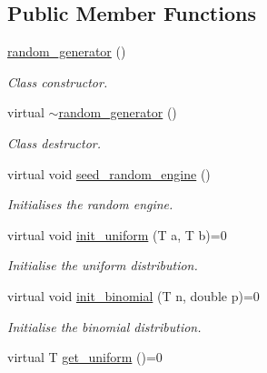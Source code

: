 \subsection*{Public Member Functions}
\begin{DoxyCompactItemize}
\item 
\hypertarget{classlgraph_1_1utils_1_1random__generator_af4f4ba363f6f72d3ded2dba9e97079bb}{\hyperlink{classlgraph_1_1utils_1_1random__generator_af4f4ba363f6f72d3ded2dba9e97079bb}{random\-\_\-generator} ()}\label{classlgraph_1_1utils_1_1random__generator_af4f4ba363f6f72d3ded2dba9e97079bb}

\begin{DoxyCompactList}\small\item\em Class constructor. \end{DoxyCompactList}\item 
\hypertarget{classlgraph_1_1utils_1_1random__generator_a87783727d9e3a109bc3ed0631edad69b}{virtual \hyperlink{classlgraph_1_1utils_1_1random__generator_a87783727d9e3a109bc3ed0631edad69b}{$\sim$random\-\_\-generator} ()}\label{classlgraph_1_1utils_1_1random__generator_a87783727d9e3a109bc3ed0631edad69b}

\begin{DoxyCompactList}\small\item\em Class destructor. \end{DoxyCompactList}\item 
\hypertarget{classlgraph_1_1utils_1_1random__generator_a4eb6998070eecb59bd89dca92d8a509c}{virtual void \hyperlink{classlgraph_1_1utils_1_1random__generator_a4eb6998070eecb59bd89dca92d8a509c}{seed\-\_\-random\-\_\-engine} ()}\label{classlgraph_1_1utils_1_1random__generator_a4eb6998070eecb59bd89dca92d8a509c}

\begin{DoxyCompactList}\small\item\em Initialises the random engine. \end{DoxyCompactList}\item 
virtual void \hyperlink{classlgraph_1_1utils_1_1random__generator_a129da597bed5b08e9c7e5a3ddce4287c}{init\-\_\-uniform} (T a, T b)=0
\begin{DoxyCompactList}\small\item\em Initialise the uniform distribution. \end{DoxyCompactList}\item 
virtual void \hyperlink{classlgraph_1_1utils_1_1random__generator_a71976e6ecbbd49de85ac270085832df1}{init\-\_\-binomial} (T n, double p)=0
\begin{DoxyCompactList}\small\item\em Initialise the binomial distribution. \end{DoxyCompactList}\item 
\hypertarget{classlgraph_1_1utils_1_1random__generator_ac18bd12c8baf8a7cbe6ef9be072c95cf}{virtual T \hyperlink{classlgraph_1_1utils_1_1random__generator_ac18bd12c8baf8a7cbe6ef9be072c95cf}{get\-\_\-uniform} ()=0}\label{classlgraph_1_1utils_1_1random__generator_ac18bd12c8baf8a7cbe6ef9be072c95cf}


\end{DoxyCompactItemize}
